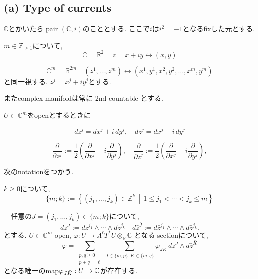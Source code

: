 \subsection{(a) Type of currents }

$\mathbb{C}$とかいたら pair  $(\mathbb{C}, i)$のこととする.
ここで$i$は$i^2=-1$となるfixした元とする. 

$m \in \mathbb{Z}_{\geq 1}$について, 
\[
\mathbb{C} = \mathbb{R}^2
\quad \ z=x+iy \leftrightarrow (x,y)
\]

\[
\mathbb{C}^m=\mathbb{R}^{2m}\quad 
(z^1,\dots,z^m) \leftrightarrow (x^1,y^1,x^2,y^2,\dots,x^m,y^m)
\]
と同一視する. 
$z^j=x^j+iy^j$とする. 

またcomplex manifoldは常に 2nd countable とする.

\begin{tcolorbox}[mybox]
\begin{defn}
\label{defn-M-4.1}
$ U \subset \mathbb{C}^m$をopenとするときに

\[
dz^j = dx^j + i\,dy^j,\quad d\bar{z}^j = dx^j - i\,dy^j
\]

\[
\frac{\partial}{\partial z^j} := \frac{1}{2}\left(\frac{\partial}{\partial x^j} - i\frac{\partial}{\partial y^j}\right),\quad
\frac{\partial}{\partial \bar{z}^j} := \frac{1}{2}\left(\frac{\partial}{\partial x^j} + i\frac{\partial}{\partial y^j}\right),
\]
\end{defn}
\end{tcolorbox}
次のnotationをつかう.

\begin{tcolorbox}[mybox]
\(k \geq 0\)について, 
\[
\{m; k \} := 
\left\{(j_1,\ldots,j_k)\in \mathbb{Z}^k \,\middle|\, 1 \leq j_1 < \cdots < j_k \leq m\right\}
\]

　任意の\(J=(j_1,\dots,j_k)\in \{m;k\}\)について, 
\[
dz^J := dz^{j_1}\wedge \cdots \wedge dz^{j_k}
\quad
d\bar{z}^{\bar{J}}:= d\bar{z}^{j_1}\wedge \cdots \wedge d\bar{z}^{j_k}.
\]
とする.  \(U\subset \mathbb{C}^m\) open, 
\(
 \varphi : U \to \Lambda^{\ell}T^{*}U\otimes_{\mathbb{R}} \mathbb{C}
 \)
となる
sectionについて, 
\[
\varphi = 
\sum_{\substack{p,q\geq 0\\ p+q=\ell}}
\sum_{J\in \{m;p\} , \bar{K}\in\{m;q\}}
\varphi_{J\bar{K}}\, dz^J\wedge d\bar{z}^{\bar{K}}
\]
となる唯一のmap\(\varphi_{J\bar{K}} : U \to \mathbb{C}\)が存在する. 
\end{tcolorbox}

